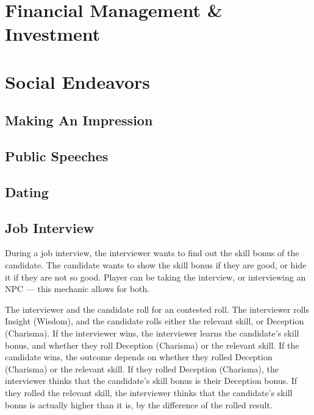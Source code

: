 \documentclass[twocolumn]{dndbook}
\begin{document}
\section{Financial Management \& Investment}


\section{Social Endeavors}
\subsection{Making An Impression}
\subsection{Public Speeches}
\subsection{Dating}
\subsection{Job Interview}
\label{subsec:job_interview}

During a job interview, the interviewer wants to find out the skill bonus of the candidate.
The candidate wants to show the skill bonus if they are good, or hide it if they are not so good.
Player can be taking the interview, or interviewing an NPC --- this mechanic allows for both.\par

The interviewer and the candidate roll for an contested roll.
The interviewer rolls Insight (Wisdom), and the candidate rolls either the relevant skill, or Deception (Charisma).
If the interviewer wins, the interviewer learns the candidate's skill bonus, and whether they roll Deception (Charisma) or the relevant skill.
If the candidate wins, the outcome depends on whether they rolled Deception (Charisma) or the relevant skill.
If they rolled Deception (Charisma), the interviewer thinks that the candidate's skill bonus is their Deception bonus.
If they rolled the relevant skill, the interviewer thinks that the candidate's skill bonus is actually higher than it is, by the difference of the rolled result.\par
\end{document}
